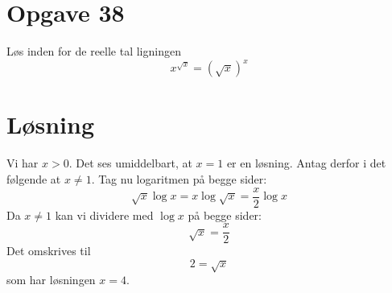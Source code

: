 \documentclass[12pt,oneside,a4paper]{article}
\begin{document}
\section{Opgave 38}
Løs inden for de reelle tal ligningen
$$
x^{\sqrt x} = \left(\sqrt x\right)^x
$$

\section{Løsning}
Vi har $x>0$. Det ses umiddelbart, at $x=1$ er en løsning. Antag derfor i det følgende at $x\neq 1$. Tag nu logaritmen på begge sider:
$$
\sqrt x \log x = x \log\sqrt x = \frac x2 \log x
$$
Da $x\neq 1$ kan vi dividere med $\log x$ på begge sider:
$$
\sqrt x = \frac x2
$$
Det omskrives til
$$
2 = \sqrt x
$$
som har løsningen $x=4$.
\end{document}
